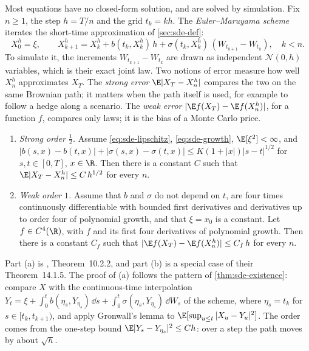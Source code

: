 Most equations have no closed-form solution, and are solved by simulation. Fix $n\ge1$, the
step $h=T/n$ and the grid $t_k=kh$. The \emph{Euler--Maruyama scheme} iterates the
short-time approximation of \cref{sec:sde-def}:
\begin{equation}\label{eq:sde-euler}
  X^h_0=\xi,\qquad
  X^h_{k+1}=X^h_k+b(t_k,X^h_k)\,h+\sigma(t_k,X^h_k)\,(W_{t_{k+1}}-W_{t_k}),\quad k<n .
\end{equation}
To simulate it, the increments $W_{t_{k+1}}-W_{t_k}$ are drawn as independent
$\mathcal N(0,h)$ variables, which is their exact joint law. Two notions of error measure
how well $X^h_n$ approximates $X_T$. The \emph{strong error} $\E|X_T-X^h_n|$ compares the
two on the same Brownian path; it matters when the path itself is used, for example to
follow a hedge along a scenario. The \emph{weak error} $|\E f(X_T)-\E f(X^h_n)|$, for a
function $f$, compares only laws; it is the bias of a Monte Carlo price.

\begin{theorem}\label{thm:sde-euler}
\leavevmode
\begin{enumerate}[label=(\alph*)]
  \item \emph{Strong order $\frac12$.} Assume \eqref{eq:sde-lipschitz}, \eqref{eq:sde-growth},
    $\E[\xi^2]<\infty$, and
    $|b(s,x)-b(t,x)|+|\sigma(s,x)-\sigma(t,x)|\le K(1+|x|)|s-t|^{1/2}$ for $s,t\in[0,T]$,
    $x\in\R$. Then there is a constant $C$ such that $\E|X_T-X^h_n|\le C\,h^{1/2}$ for every
    $n$.
  \item \emph{Weak order $1$.} Assume that $b$ and $\sigma$ do not depend on $t$, are four
    times continuously differentiable with bounded first derivatives and derivatives up to
    order four of polynomial growth, and that $\xi=x_0$ is a constant. Let $f\in C^4(\R)$,
    with $f$ and its first four derivatives of polynomial growth. Then there is a constant
    $C_f$ such that $|\E f(X_T)-\E f(X^h_n)|\le C_f\,h$ for every $n$.
\end{enumerate}
\end{theorem}

Part (a) is \textcite{kloeden-platen}, Theorem~10.2.2, and part (b) is a special case of
their Theorem~14.1.5. The proof of (a) follows the pattern of \cref{thm:sde-existence}:
compare $X$ with the continuous-time interpolation
$Y_t=\xi+\int_0^tb(\eta_s,Y_{\eta_s})\,\dd s+\int_0^t\sigma(\eta_s,Y_{\eta_s})\,\dd W_s$ of the
scheme, where $\eta_s=t_k$ for $s\in[t_k,t_{k+1})$, and apply Gronwall's lemma to
$\E[\sup_{u\le t}|X_u-Y_u|^2]$. The order comes from the one-step bound
$\E|Y_s-Y_{\eta_s}|^2\le Ch$: over a step the path moves by about $\sqrt h$.

